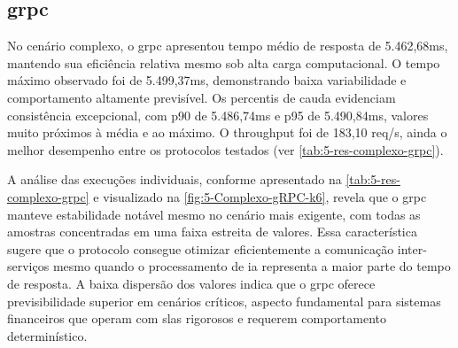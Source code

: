 \subsection{\acrshort{grpc}}

No cenário complexo, o \gls{grpc} apresentou tempo médio de resposta de 5.462,68ms, mantendo sua eficiência relativa mesmo sob alta carga computacional. O tempo máximo observado foi de 5.499,37ms, demonstrando baixa variabilidade e comportamento altamente previsível. Os percentis de cauda evidenciam consistência excepcional, com p90 de 5.486,74ms e p95 de 5.490,84ms, valores muito próximos à média e ao máximo. O throughput foi de 183,10 req/s, ainda o melhor desempenho entre os protocolos testados (ver \autoref{tab:5-res-complexo-grpc}).

\begin{table}[H]
\centering
\caption{\gls{grpc} comparado com os demais protocolos — Cenário Complexo (Thrift/\gls{rest} em $\Delta$\% vs \gls{grpc})}
\label{tab:5-res-complexo-grpc}
\end{table}

A análise das execuções individuais, conforme apresentado na \autoref{tab:5-res-complexo-grpc} e visualizado na \autoref{fig:5-Complexo-gRPC-k6}, revela que o \gls{grpc} manteve estabilidade notável mesmo no cenário mais exigente, com todas as amostras concentradas em uma faixa estreita de valores. Essa característica sugere que o protocolo consegue otimizar eficientemente a comunicação inter-serviços mesmo quando o processamento de \gls{ia} representa a maior parte do tempo de resposta. A baixa dispersão dos valores indica que o \gls{grpc} oferece previsibilidade superior em cenários críticos, aspecto fundamental para sistemas financeiros que operam com \acrshort{sla}s rigorosos e requerem comportamento determinístico.

